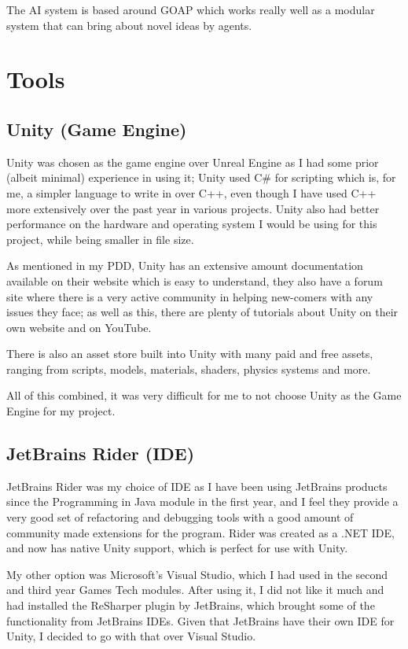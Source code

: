 \documentclass[12pt]{report}
\begin{document}
The AI system is based around GOAP which works really well as a modular system that can bring about novel ideas by agents.

\section{Tools}

\subsection{Unity (Game Engine)}
Unity was chosen as the game engine over Unreal Engine as I had some prior (albeit minimal) experience in using it; Unity used C\# for scripting which is, for me, a simpler language to write in over C++, even though I have used C++ more extensively over the past year in various projects. Unity also had better performance on the hardware and operating system I would be using for this project, while being smaller in file size.

As mentioned in my PDD, Unity has an extensive amount documentation available on their website which is easy to understand, they also have a forum site where there is a very active community in helping new-comers with any issues they face; as well as this, there are plenty of tutorials about Unity on their own website and on YouTube.

There is also an asset store built into Unity with many paid and free assets, ranging from scripts, models, materials, shaders, physics systems and more.

All of this combined, it was very difficult for me to not choose Unity as the Game Engine for my project.

\subsection{JetBrains Rider (IDE)}
JetBrains Rider was my choice of IDE as I have been using JetBrains products since the Programming in Java module in the first year, and I feel they provide a very good set of refactoring and debugging tools with a good amount of community made extensions for the program. Rider was created as a .NET IDE, and now has native Unity support, which is perfect for use with Unity.

My other option was Microsoft's Visual Studio, which I had used in the second and third year Games Tech modules. After using it, I did not like it much and had installed the ReSharper plugin by JetBrains, which brought some of the functionality from JetBrains IDEs. Given that JetBrains have their own IDE for Unity, I decided to go with that over Visual Studio.
\end{document}
